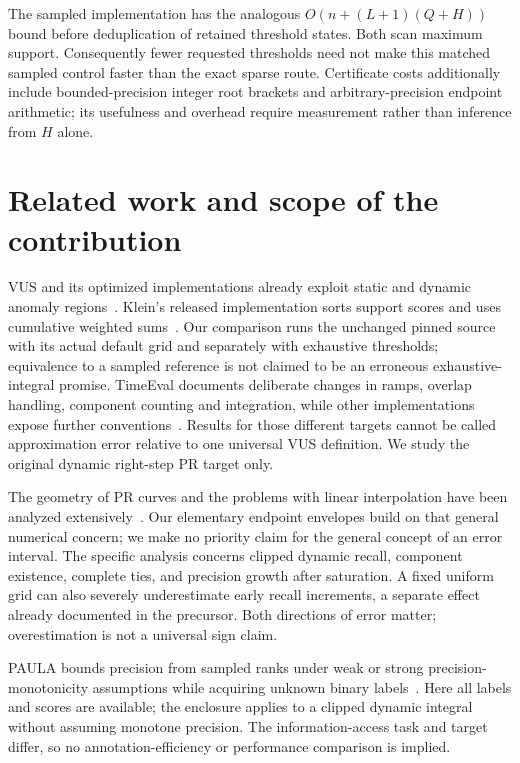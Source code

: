 \documentclass[10pt]{article}
\begin{document}
The sampled implementation has the analogous
$O(n+(L+1)(Q+H))$ bound before deduplication of retained threshold states.
Both scan maximum support. Consequently fewer requested thresholds need
not make this matched sampled control faster than the exact sparse route.
Certificate costs additionally include bounded-precision integer root
brackets and arbitrary-precision endpoint arithmetic; its usefulness and
overhead require measurement rather than inference from $H$ alone.



\section{Related work and scope of the contribution}
VUS and its optimized implementations already exploit static and dynamic
anomaly regions~\citep{paparrizos2022,boniol2025}. Klein's released
implementation sorts support scores and uses cumulative weighted
sums~\citep{klein2026}. Our comparison runs the unchanged pinned source
with its actual default grid and separately with exhaustive thresholds;
equivalence to a sampled reference is not claimed to be an erroneous
exhaustive-integral promise. TimeEval documents deliberate changes in
ramps, overlap handling, component counting and integration, while other
implementations expose further conventions~\citep{timeevalvus,ffvus2026}.
Results for those different targets cannot be called approximation error
relative to one universal VUS definition. We study the original dynamic
right-step PR target only.

The geometry of PR curves and the problems with linear interpolation have
been analyzed extensively~\citep{davis2006,keilwagen2014}. Our elementary
endpoint envelopes build on that general numerical concern; we make no
priority claim for the general concept of an error interval. The specific
analysis concerns clipped dynamic recall, component existence, complete
ties, and precision growth after saturation. A fixed uniform grid can
also severely underestimate early recall increments, a separate effect
already documented in the precursor. Both directions of error matter;
overestimation is not a universal sign claim.

PAULA bounds precision from sampled ranks under weak or strong
precision-monotonicity assumptions while acquiring unknown binary
labels~\citep{sabharwal2017}. Here all labels and scores are available;
the enclosure applies to a clipped dynamic integral without assuming
monotone precision. The information-access task and target differ,
so no annotation-efficiency or performance comparison is implied.
\end{document}
